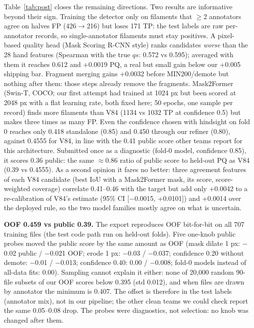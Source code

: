 \documentclass[10pt,twocolumn]{article}
\begin{document}
Table~\ref{tab:post} closes the remaining directions. Two results are informative beyond their sign. Training
the detector only on filaments that $\ge$2 annotators agree on halves FP (426$\to$216) but loses 171 TP:
the test labels are raw per-annotator records, so single-annotator filaments must stay positives. A
pixel-based quality head (Mask Scoring R-CNN style) ranks candidates \emph{worse} than the 28 hand features
(Spearman with the true $q s$: 0.572 vs 0.595); averaged with them it reaches 0.612 and +0.0019 PQ, a real but
small gain below our +0.005 shipping bar. Fragment merging gains +0.0032 before MIN200/demote but nothing
after them: those steps already remove the fragments. Mask2Former (Swin-T, COCO; our first attempt had trained at
1024 px but been scored at 2048 px with a flat learning rate, both fixed here; 50 epochs, one sample per record)
finds more filaments than V84 (1134 vs 1032 TP at confidence 0.5) but makes three times as many FP. Even the
confidence chosen with hindsight on fold 0 reaches only 0.418 standalone (0.85) and 0.450 through our refiner
(0.80), against 0.4555 for V84, in line with the 0.41 public score other teams report for this architecture.
Submitted once as a diagnostic (fold-0 model, confidence 0.85), it scores 0.36 public: the same $\approx$0.86
ratio of public score to held-out PQ as V84 (0.39 vs 0.4555). As a second opinion it fares no better: three
agreement features of each V84 candidate (best IoU with a Mask2Former mask, its score, score-weighted coverage)
correlate 0.41--0.46 with the target but add only +0.0042 to a re-calibration of V84's estimate (95\% CI
[$-$0.0015, +0.0101]) and +0.0014 over the deployed rule, so the two model families mostly agree on what is uncertain.

\textbf{OOF 0.459 vs public 0.39.} The export reproduces OOF bit-for-bit on all 707 training files (the test
code path run on held-out folds). Five one-knob public probes moved the public score by the same amount as
OOF (mask dilate 1 px: $-$0.02 public / $-$0.021 OOF; erode 1 px: $-$0.03 / $-$0.037; confidence 0.20 without
demote: $-$0.01 / $-$0.013; confidence 0.40: 0.00 / $-$0.008; fold-0 models instead of all-data fits: 0.00).
Sampling cannot explain it either: none of 20{,}000 random 90-file subsets of our OOF scores below 0.395
(std 0.012), and when files are drawn by annotator the minimum is 0.407. The offset is
therefore in the test labels (annotator mix), not in our pipeline; the other clean teams we could check report
the same 0.05--0.08 drop. The probes were diagnostics, not selection: no knob was changed after them.
\end{document}
